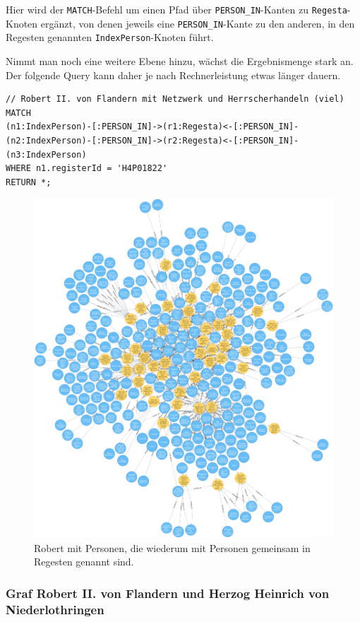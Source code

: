 \documentclass[ngerman,]{scrreprt}
\begin{document}
Hier wird der \texttt{MATCH}-Befehl um einen Pfad über \texttt{PERSON\_IN}-Kanten zu \texttt{Regesta}-Knoten ergänzt, von denen jeweils eine \texttt{PERSON\_IN}-Kante zu den anderen, in den Regesten genannten \texttt{IndexPerson}-Knoten führt.

Nimmt man noch eine weitere Ebene hinzu, wächst die Ergebnismenge stark an. Der folgende Query kann daher je nach Rechnerleistung etwas länger dauern.

\begin{verbatim}
// Robert II. von Flandern mit Netzwerk und Herrscherhandeln (viel)
MATCH
(n1:IndexPerson)-[:PERSON_IN]->(r1:Regesta)<-[:PERSON_IN]-
(n2:IndexPerson)-[:PERSON_IN]->(r2:Regesta)<-[:PERSON_IN]-
(n3:IndexPerson)
WHERE n1.registerId = 'H4P01822'
RETURN *;
\end{verbatim}

\begin{figure}
\centering
\includegraphics{Bilder/RI2Graph/Robert-viel.png}
\caption{Robert mit Personen, die wiederum mit Personen gemeinsam in Regesten genannt sind.}
\end{figure}

\subsubsection{Graf Robert II. von Flandern und Herzog Heinrich von Niederlothringen}\label{graf-robert-ii.-von-flandern-und-herzog-heinrich-von-niederlothringen}
\end{document}
